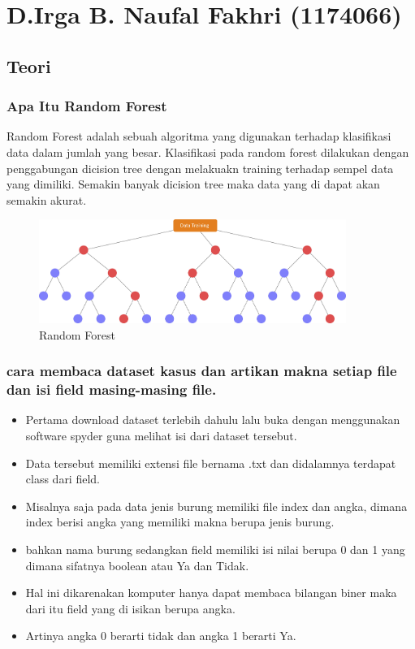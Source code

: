 \section{D.Irga B. Naufal Fakhri (1174066)}
\subsection{Teori}

\subsubsection{Apa Itu Random Forest}

\hfill\break
Random Forest adalah sebuah algoritma yang digunakan terhadap klasifikasi data dalam jumlah yang besar. Klasifikasi pada random forest dilakukan dengan penggabungan dicision tree dengan melakuakn training terhadap sempel data yang dimiliki. Semakin banyak dicision tree maka data yang di dapat akan
semakin akurat.
\begin{figure}[H]
\centerline{\includegraphics[width=10cm]{figures/1174066/3/1.jpg}}
\caption{Random Forest}
\label{labelgambar}
\end{figure}

\subsubsection{cara membaca dataset kasus dan artikan makna setiap file dan isi field masing-masing file.}

\hfill\break
\begin{itemize}
\item Pertama download dataset terlebih dahulu lalu buka dengan menggunakan software spyder guna melihat isi dari dataset tersebut.

\item Data tersebut memiliki extensi file bernama .txt dan didalamnya terdapat class dari field.

\item Misalnya saja pada data jenis burung memiliki file index dan angka, dimana index berisi angka yang memiliki makna berupa jenis burung.

\item bahkan nama burung sedangkan field memiliki isi nilai berupa 0 dan 1 yang dimana sifatnya boolean atau Ya dan Tidak.

\item Hal ini dikarenakan komputer hanya dapat membaca bilangan biner maka dari itu field yang di isikan berupa angka.

\item Artinya angka 0 berarti tidak dan angka 1 berarti Ya.
\end{itemize}

